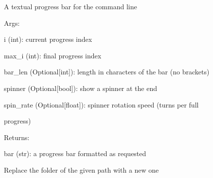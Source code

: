 \documentclass[letterpaper,10pt,english]{sphinxmanual}
\begin{document}

\begin{fulllineitems}
\label{doctree/soprano.utils:soprano.utils.progbar}
A textual progress bar for the command line

\begin{DUlineblock}{0em}
\item[] Args:
\item[]
\begin{DUlineblock}{\DUlineblockindent}
\item[] i (int): current progress index
\item[] max\_i (int): final progress index
\item[] bar\_len (Optional{[}int{]}): length in characters of the bar (no brackets)
\item[] spinner (Optional{[}bool{]}): show a spinner at the end
\item[] spin\_rate (Optional{[}float{]}): spinner rotation speed (turns per full
\item[]
\begin{DUlineblock}{\DUlineblockindent}
\item[] progress)
\end{DUlineblock}
\end{DUlineblock}
\end{DUlineblock}

\begin{DUlineblock}{0em}
\item[] Returns:
\item[]
\begin{DUlineblock}{\DUlineblockindent}
\item[] bar (str): a progress bar formatted as requested
\end{DUlineblock}
\end{DUlineblock}

\end{fulllineitems}


\begin{fulllineitems}
\label{doctree/soprano.utils:soprano.utils.replace_folder}
Replace the folder of the given path with a new one

\end{fulllineitems}
\end{document}

